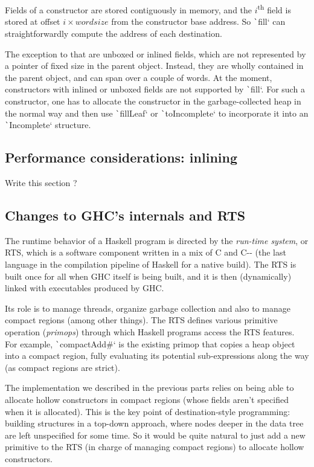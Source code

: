 \documentclass[english]{jflart}
\newcommand{\TODO}[1]{{\color{red}\large #1}}
\begin{document}
Fields of a constructor are stored contiguously in memory, and the $i$\textsuperscript{th} field is stored at offset $i \times wordsize$ from the constructor base address. So \texttt`fill` can straightforwardly compute the address of each destination.

The exception to that are unboxed or inlined fields, which are not represented by a pointer of fixed size in the parent object. Instead, they are wholly contained in the parent object, and can span over a couple of words. At the moment, constructors with inlined or unboxed fields are not supported by \texttt`fill`. For such a constructor, one has to allocate the constructor in the garbage-collected heap in the normal way and then use \texttt`fillLeaf` or \texttt`toIncomplete` to incorporate it into an \texttt`Incomplete` structure.

\subsection{Performance considerations: inlining}

\TODO{Write this section ?}

\subsection{Changes to GHC's internals and RTS}

The runtime behavior of a Haskell program is directed by the \emph{run-time system}, or RTS, which is a software component written in a mix of C and C-{}- (the last language in the compilation pipeline of Haskell for a native build). The RTS is built once for all when GHC itself is being built, and it is then (dynamically) linked with executables produced by GHC.

Its role is to manage threads, organize garbage collection and also to manage compact regions (among other things). The RTS defines various primitive operation (\emph{primops}) through which Haskell programs access the RTS features. For example, \texttt`compactAdd#` is the existing primop that copies a heap object into a compact region, fully evaluating its potential sub-expressions along the way (as compact regions are strict).

The implementation we described in the previous parts relies on being able to allocate hollow constructors in compact regions (whose fields aren't specified when it is allocated). This is the key point of destination-style programming: building structures in a top-down approach, where nodes deeper in the data tree are left unspecified for some time. So it would be quite natural to just add a new primitive to the RTS (in charge of managing compact regions) to allocate hollow constructors.
\end{document}
